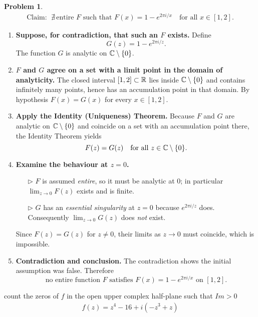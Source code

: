 \documentclass[12pt]{article}
\theoremstyle{definition} %
\newtheorem{problem}{Problem}
\theoremstyle{plain} %
\begin{document}
\begin{problem}
    \begin{align}
        \text{Claim: }\;
        \nexists\,\text{entire }F\text{ such that }
        F(x)=1-e^{2\pi i/x}\quad\text{for all }x\in[1,2].
    \end{align}

    \begin{enumerate}
        \item \textbf{Suppose, for contradiction, that such an $F$ exists.}
              Define
              \[
                  G(z)=1-e^{2\pi i/z}.
              \]
              The function $G$ is analytic on $\Bbb C\setminus\{0\}$.

        \item \textbf{$F$ and $G$ agree on a set with a limit point in the domain of analyticity.}
              The closed interval $[1,2]\subset\Bbb R$ lies inside
              $\Bbb C\setminus\{0\}$ and contains infinitely many points,
              hence has an accumulation point in that domain.
              By hypothesis $F(x)=G(x)$ for every $x\in[1,2]$.

        \item \textbf{Apply the Identity (Uniqueness) Theorem.}
              Because $F$ and $G$ are analytic on $\Bbb C\setminus\{0\}$
              and coincide on a set with an accumulation point there,
              the Identity Theorem yields
              \[
                  F(z)=G(z)\quad\text{for all }z\in\Bbb C\setminus\{0\}.
              \]

        \item \textbf{Examine the behaviour at $z=0$.}
              \begin{enumerate}
                  \item[$\triangleright$] $F$ is assumed \emph{entire},
                        so it must be analytic at $0$; in particular
                        $\displaystyle\lim_{z\to0}F(z)$ exists and is finite.
                  \item[$\triangleright$] $G$ has an \emph{essential singularity}
                        at $z=0$ because $e^{2\pi i/z}$ does.
                        Consequently $\displaystyle\lim_{z\to0}G(z)$
                        does \emph{not} exist.
              \end{enumerate}
              Since $F(z)=G(z)$ for $z\neq0$, their limits as $z\to0$
              must coincide, which is impossible.

        \item \textbf{Contradiction and conclusion.}
              The contradiction shows the initial assumption was false.
              Therefore
              \[
                  \boxed{\text{no entire function }F\text{ satisfies }
                         F(x)=1-e^{2\pi i/x}\text{ on }[1,2].}
              \]
    \end{enumerate}
\end{problem}
count the zeros of $f$ in the open upper complex half-plane such that $Im>0$ 
\begin{align}
    f(z) = z^{4}-16+i(-z^{3}+z)
\end{align}
\end{document}
